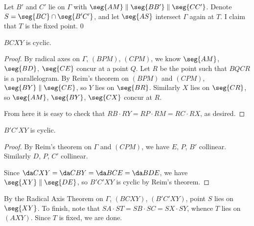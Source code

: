 Let $B'$ and $C'$ lie on $\Gamma$ with $\seg{AM}\parallel\seg{BB'}\parallel\seg{CC'}$. Denote $S=\seg{BC}\cap\seg{B'C'}$, and let $\seg{AS}$ intersect $\Gamma$ again at $T$. I claim that $T$ is the fixed point.
\setcounter{claim}0
\begin{claim}
    $BCXY$ is cyclic.
\end{claim}
\begin{proof}
    By radical axes on $\Gamma$, $(BPM)$, $(CPM)$, we know $\seg{AM}$, $\seg{BD}$, $\seg{CE}$ concur at a point $Q$. Let $R$ be the point such that $BQCR$ is a parallelogram. By Reim's theorem on $(BPM)$ and $(CPM)$, $\seg{BY}\parallel\seg{CE}$, so $Y$ lies on $\seg{BR}$. Similarly $X$ lies on $\seg{CR}$, so $\seg{AM}$, $\seg{BY}$, $\seg{CX}$ concur at $R$.

    From here it is easy to check that $RB\cdot RY=RP\cdot RM=RC\cdot RX$, as desired.
\end{proof}
\begin{claim}
    $B'C'XY$ is cyclic.
\end{claim}
\begin{proof}
    By Reim's theorem on $\Gamma$ and $(CPM)$, we have $E$, $P$, $B'$ collinear. Similarly $D$, $P$, $C'$ collinear.

    Since $\da CXY=\da CBY=\da BCE=\da BDE$, we have $\seg{XY}\parallel\seg{DE}$, so $B'C'XY$ is cyclic by Reim's theorem.
\end{proof}

By the Radical Axis Theorem on $\Gamma$, $(BCXY)$, $(B'C'XY)$, point $S$ lies on $\seg{XY}$. To finish, note that $SA\cdot ST=SB\cdot SC=SX\cdot SY$, whence $T$ lies on $(AXY)$. Since $T$ is fixed, we are done.
